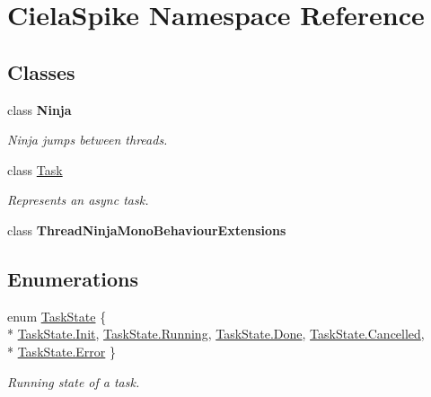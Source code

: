 \hypertarget{namespace_ciela_spike}{}\section{Ciela\+Spike Namespace Reference}
\label{namespace_ciela_spike}
\subsection*{Classes}
\begin{DoxyCompactItemize}
\item 
class {\bfseries Ninja}
\begin{DoxyCompactList}\small\item\em Ninja jumps between threads. \end{DoxyCompactList}\item 
class \hyperlink{class_ciela_spike_1_1_task}{Task}
\begin{DoxyCompactList}\small\item\em Represents an async task. \end{DoxyCompactList}\item 
class {\bfseries Thread\+Ninja\+Mono\+Behaviour\+Extensions}
\end{DoxyCompactItemize}
\subsection*{Enumerations}
\begin{DoxyCompactItemize}
\item 
enum \hyperlink{namespace_ciela_spike_a4782eb2c0b65a1d593a94740bf994960}{Task\+State} \{ \\*
\hyperlink{namespace_ciela_spike_a4782eb2c0b65a1d593a94740bf994960a95b19f7739b0b7ea7d6b07586be54f36}{Task\+State.\+Init}, 
\hyperlink{namespace_ciela_spike_a4782eb2c0b65a1d593a94740bf994960a5bda814c4aedb126839228f1a3d92f09}{Task\+State.\+Running}, 
\hyperlink{namespace_ciela_spike_a4782eb2c0b65a1d593a94740bf994960af92965e2c8a7afb3c1b9a5c09a263636}{Task\+State.\+Done}, 
\hyperlink{namespace_ciela_spike_a4782eb2c0b65a1d593a94740bf994960aa149e85a44aeec9140e92733d9ed694e}{Task\+State.\+Cancelled}, 
\\*
\hyperlink{namespace_ciela_spike_a4782eb2c0b65a1d593a94740bf994960a902b0d55fddef6f8d651fe1035b7d4bd}{Task\+State.\+Error}
 \}\begin{DoxyCompactList}\small\item\em Running state of a task. \end{DoxyCompactList}
\end{DoxyCompactItemize}


